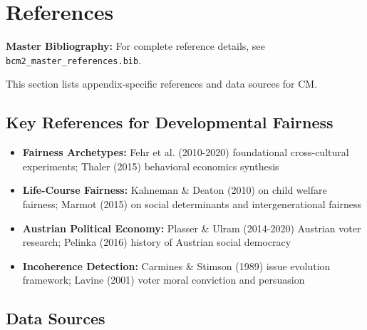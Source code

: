 \section{References}
\label{sec:cm-references}

\begin{tcolorbox}[colback=blue!5!white, colframe=blue!75!black]
\textbf{Master Bibliography:} For complete reference details, see
\texttt{bcm2\_master\_references.bib}.

This section lists appendix-specific references and data sources for CM.
\end{tcolorbox}

\vspace{0.5em}

\subsection{Key References for Developmental Fairness}

\begin{itemize}[nosep]
\item \textbf{Fairness Archetypes:} Fehr et al. (2010-2020) foundational cross-cultural experiments;
Thaler (2015) behavioral economics synthesis

\item \textbf{Life-Course Fairness:} Kahneman \& Deaton (2010) on child welfare fairness;
Marmot (2015) on social determinants and intergenerational fairness

\item \textbf{Austrian Political Economy:} Plasser \& Ulram (2014-2020) Austrian voter research;
Pelinka (2016) history of Austrian social democracy

\item \textbf{Incoherence Detection:} Carmines \& Stimson (1989) issue evolution framework;
Lavine (2001) voter moral conviction and persuasion

\end{itemize}

\subsection{Data Sources}

